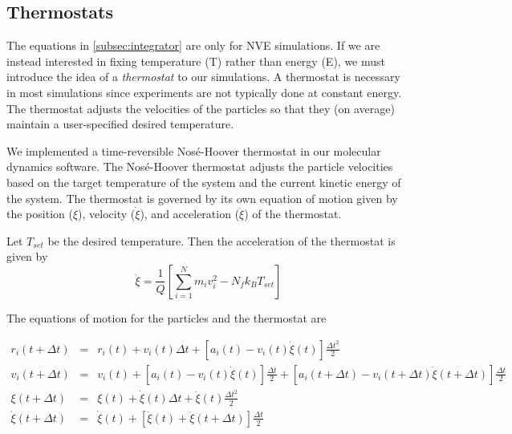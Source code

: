 \documentclass[12pt]{article}
\begin{document}
\subsection{Thermostats} \label{subsec:thermostat}
The equations in \ref{subsec:integrator} are only for NVE simulations.
%
If we are instead interested in fixing temperature (T) rather than energy (E), we must introduce the idea of a {\em thermostat} to our simulations.
%
A thermostat is necessary in most simulations since experiments are not typically done at constant energy.
%
The thermostat adjusts the velocities of the particles so that they (on average) maintain a user-specified desired temperature.

We implemented a time-reversible Nos\'{e}-Hoover thermostat in our molecular dynamics software.
%
The Nos\'{e}-Hoover thermostat adjusts the particle velocities based on the target temperature of the system and the current kinetic energy of the system.
%
The thermostat is governed by its own equation of motion given by the position ($\xi$), velocity ($\dot{\xi}$), and acceleration ($\ddot{\xi}$) of the thermostat.

Let $T_{set}$ be the desired temperature.
%
Then the acceleration of the thermostat is given by
\begin{equation}
\ddot{\xi} = \frac{1}{Q} \left[ \sum_{i=1}^{N} m_i v_i^2 - N_f k_B T_{set} \right]
\end{equation}

The equations of motion for the particles and the thermostat are

\small
\begin{eqnarray}
r_i(t + \Delta t) &=& r_i(t) + v_i(t) \Delta t + \left[ a_i(t) - v_i(t)\dot{\xi}(t) \right] \frac{\Delta t^2}{2}\\
v_i(t + \Delta t) &=& v_i(t) + \left[ a_i(t) - v_i(t) \dot{\xi}(t) \right] \frac{\Delta t}{2} + \left[a_i(t + \Delta t)  - v_i(t + \Delta t) \dot{\xi}(t + \Delta t) \right] \frac{\Delta t}{2} \\
\xi(t + \Delta t) & = & \xi(t) + \dot{\xi}(t) \Delta t + \ddot{\xi}(t) \frac{\Delta t^2 }{2} \\
\dot{\xi}(t + \Delta t)  & = & \dot{\xi}(t) + \left[ \ddot{\xi}(t) + \ddot{\xi} (t + \Delta t)  \right] \frac{\Delta t}{2}
\end{eqnarray}
\normalsize
\end{document}
